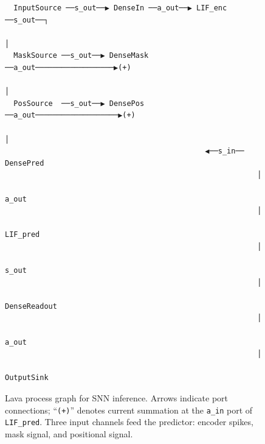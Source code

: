 \documentclass[11pt,a4paper]{article}
\begin{document}
\begin{figure}[htbp]
\centering
\small
\begin{verbatim}
  InputSource ──s_out──▶ DenseIn ──a_out──▶ LIF_enc ──s_out──┐
                                                              │
  MaskSource ──s_out──▶ DenseMask ──a_out──────────────────▶(+)
                                                              │
  PosSource  ──s_out──▶ DensePos ──a_out───────────────────▶(+)
                                                              │
                                              ◀──s_in── DensePred
                                                          │
                                                       a_out
                                                          │
                                                       LIF_pred
                                                          │
                                                       s_out
                                                          │
                                                    DenseReadout
                                                          │
                                                       a_out
                                                          │
                                                    OutputSink
\end{verbatim}
\caption{Lava process graph for SNN inference.  Arrows indicate port
connections; ``\texttt{(+)}'' denotes current summation at the
\texttt{a\_in} port of \texttt{LIF\_pred}.  Three input channels feed the
predictor: encoder spikes, mask signal, and positional signal.}
\label{fig:lava-graph}
\end{figure}
\end{document}
